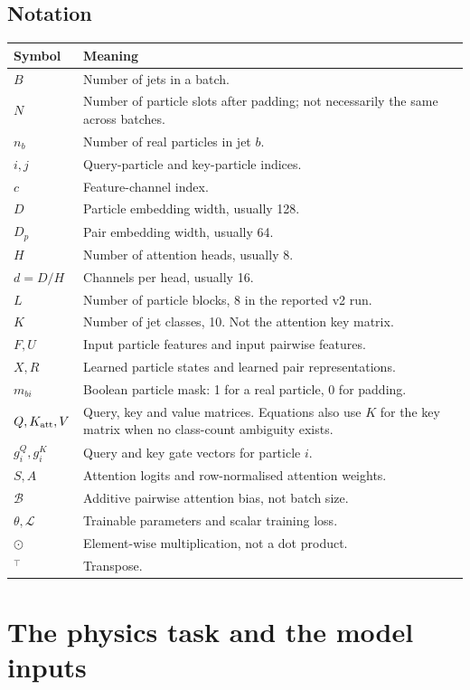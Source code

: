 \documentclass[11pt,a4paper]{article}
\newcommand{\Had}{\odot}
\numberwithin{equation}{section}
\begin{document}
\subsection{Notation}
\begin{longtable}{p{25mm}p{112mm}}
\toprule Symbol & Meaning\\ \midrule
$B$ & Number of jets in a batch.\\
$N$ & Number of particle slots after padding; not necessarily the same across batches.\\
$n_b$ & Number of real particles in jet $b$.\\
$i,j$ & Query-particle and key-particle indices.\\
$c$ & Feature-channel index.\\
$D$ & Particle embedding width, usually 128.\\
$D_p$ & Pair embedding width, usually 64.\\
$H$ & Number of attention heads, usually 8.\\
$d=D/H$ & Channels per head, usually 16.\\
$L$ & Number of particle blocks, 8 in the reported v2 run.\\
$K$ & Number of jet classes, 10. Not the attention key matrix.\\
$F,U$ & Input particle features and input pairwise features.\\
$X,R$ & Learned particle states and learned pair representations.\\
$m_{bi}$ & Boolean particle mask: 1 for a real particle, 0 for padding.\\
$Q,K_{\rm att},V$ & Query, key and value matrices. Equations also use $K$ for
the key matrix when no class-count ambiguity exists.\\
$g^Q_i,g^K_i$ & Query and key gate vectors for particle $i$.\\
$S,A$ & Attention logits and row-normalised attention weights.\\
$\mathcal B$ & Additive pairwise attention bias, not batch size.\\
$\theta,\mathcal L$ & Trainable parameters and scalar training loss.\\
$\Had$ & Element-wise multiplication, not a dot product.\\
$^\top$ & Transpose.\\
\bottomrule
\end{longtable}

\section{The physics task and the model inputs}\label{sec:inputs}
\end{document}
